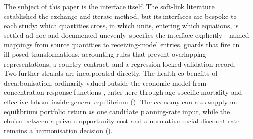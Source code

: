 The subject of this paper is the interface itself. The soft-link literature
established the exchange-and-iterate method, but its interfaces are bespoke to each
study: which quantities cross, in which units, entering which equations, is settled
ad hoc and documented unevenly.  specifies the interface
explicitly---named mappings from source quantities to receiving-model entries, guards
that fire on ill-posed transformations, accounting rules that prevent overlapping
representations, a country contract, and a regression-locked validation record. Two
further strands are incorporated directly. The
health co-benefits of decarbonisation, ordinarily valued outside the economic model
from concentration-response functions \citep{gbd_2019_risk,burnett_gemm_2018}, enter
here through age-specific mortality and effective labour inside
general equilibrium (). The economy can also supply an equilibrium
portfolio return as one candidate planning-rate input, while the choice between a private
opportunity cost and a normative social discount rate remains a harmonisation decision
().
